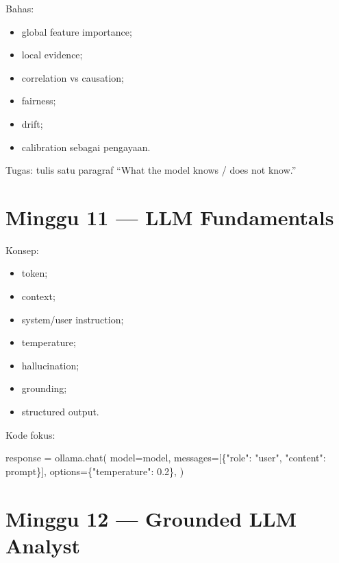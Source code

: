 \documentclass[
  indonesian,
  letterpaper,
  DIV=11,
  numbers=noendperiod]{scrreprt}
\newenvironment{Shaded}{\begin{snugshade}}{\end{snugshade}}
\newcommand{\FloatTok}[1]{\textcolor[rgb]{0.68,0.00,0.00}{#1}}
\newcommand{\NormalTok}[1]{\textcolor[rgb]{0.00,0.23,0.31}{#1}}
\newcommand{\OperatorTok}[1]{\textcolor[rgb]{0.37,0.37,0.37}{#1}}
\newcommand{\StringTok}[1]{\textcolor[rgb]{0.13,0.47,0.30}{#1}}
\providecommand{\tightlist}{%
  \setlength{\itemsep}{0pt}\setlength{\parskip}{0pt}}
\begin{document}
Bahas:

\begin{itemize}
\tightlist
\item
  global feature importance;
\item
  local evidence;
\item
  correlation vs causation;
\item
  fairness;
\item
  drift;
\item
  calibration sebagai pengayaan.
\end{itemize}

Tugas: tulis satu paragraf ``What the model knows / does not know.''

\section{Minggu 11 --- LLM
Fundamentals}\label{minggu-11-llm-fundamentals}

Konsep:

\begin{itemize}
\tightlist
\item
  token;
\item
  context;
\item
  system/user instruction;
\item
  temperature;
\item
  hallucination;
\item
  grounding;
\item
  structured output.
\end{itemize}

Kode fokus:

\begin{Shaded}
\begin{Highlighting}[]
\NormalTok{response }\OperatorTok{=}\NormalTok{ ollama.chat(}
\NormalTok{    model}\OperatorTok{=}\NormalTok{model,}
\NormalTok{    messages}\OperatorTok{=}\NormalTok{[\{}\StringTok{"role"}\NormalTok{: }\StringTok{"user"}\NormalTok{, }\StringTok{"content"}\NormalTok{: prompt\}],}
\NormalTok{    options}\OperatorTok{=}\NormalTok{\{}\StringTok{"temperature"}\NormalTok{: }\FloatTok{0.2}\NormalTok{\},}
\NormalTok{)}
\end{Highlighting}
\end{Shaded}

\section{Minggu 12 --- Grounded LLM
Analyst}\label{minggu-12-grounded-llm-analyst}
\end{document}
